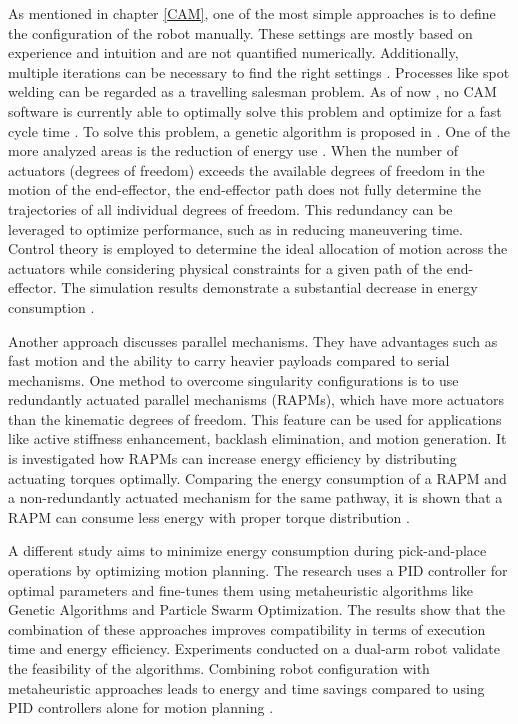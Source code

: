 \documentclass[ZLstudentexpose%
              ,optBiber%
              ,optEnglish%
              ,10pt
              ]{ZLlatex}%
\begin{document}
As mentioned in chapter \ref{CAM}, one of the most simple approaches is to define the configuration of the robot manually. These settings are mostly based on experience and intuition and are not quantified numerically. Additionally, multiple iterations can be necessary to find the right settings \cite{Pan}.\newline
Processes like spot welding can be regarded as a travelling salesman problem. As of now , no CAM software is currently able to optimally solve this problem and optimize for a fast cycle time \cite{Pan}. To solve this problem, a genetic algorithm is proposed in \cite{Kim.2002}.\newline
One of the more analyzed areas is the reduction of energy use \cite{Halevi.2011, Li.2015}. When the number of actuators (degrees of freedom) exceeds the available degrees of freedom in the motion of the end-effector, the end-effector path does not fully determine the trajectories of all individual degrees of freedom. This redundancy can be leveraged to optimize performance, such as in reducing maneuvering time. Control theory is employed to determine the ideal allocation of motion across the actuators while considering physical constraints for a given path of the end-effector. The simulation results demonstrate a substantial decrease in energy consumption \cite{Halevi.2011}.

Another approach discusses parallel mechanisms. They have advantages such as fast motion and the ability to carry heavier payloads compared to serial mechanisms. One method to overcome singularity configurations is to use redundantly actuated parallel mechanisms (RAPMs), which have more actuators than the kinematic degrees of freedom. This feature can be used for applications like active stiffness enhancement, backlash elimination, and motion generation. It is investigated how RAPMs can increase energy efficiency by distributing actuating torques optimally. Comparing the energy consumption of a RAPM and a non-redundantly actuated mechanism for the same pathway, it is shown that a RAPM can consume less energy with proper torque distribution \cite{Lee.2015}. 


A different study aims to minimize energy consumption during pick-and-place operations by optimizing motion planning. The research uses a PID controller for optimal parameters and fine-tunes them using metaheuristic algorithms like Genetic Algorithms and Particle Swarm Optimization. The results show that the combination of these approaches improves compatibility in terms of execution time and energy efficiency. Experiments conducted on a dual-arm robot validate the feasibility of the algorithms. Combining robot configuration with metaheuristic approaches leads to energy and time savings compared to using PID controllers alone for motion planning \cite{Nonoyama.2022}.
\end{document}

